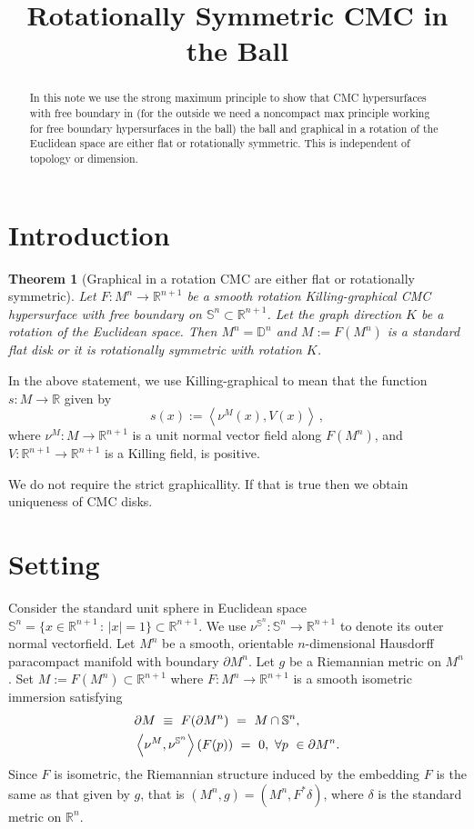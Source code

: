\documentclass[10pt]{amsart}
\title{Rotationally Symmetric CMC in the Ball}
\author{}
\newcommand{\IP}[2]{\left< #1 , #2 \right>}
\newcommand{\R}{\ensuremath{\mathbb{R}}}
\newcommand{\D}{\ensuremath{\mathbb{D}}}
\renewcommand{\S}{\ensuremath{\mathbb{S}}}
\newtheorem{thm}{Theorem}[section]
\theoremstyle{remark}
\begin{document}
\begin{abstract}
In this note we use the strong maximum principle to show that CMC hypersurfaces with free boundary in (for the outside we need a noncompact max principle working for free boundary hypersurfaces in the ball) the ball and graphical in a rotation of the Euclidean space are either flat or rotationally symmetric. This is independent of topology or dimension.
\end{abstract}

\maketitle

\section{Introduction}


\begin{thm}[Graphical in a rotation CMC are either flat or rotationally symmetric]
Let $F:M^n\rightarrow\R^{n+1}$ be a smooth rotation Killing-graphical CMC
hypersurface with free boundary on $\S^n\subset\R^{n+1}$. Let the graph direction $K$ be a rotation of the Euclidean space. Then $M^n = \D^n$
and $M := F(M^n)$ is a standard flat disk or it is rotationally symmetric with rotation $K$.
\label{thmuniqueness}
\end{thm}

In the above statement, we use Killing-graphical to mean that the function
$s:M\rightarrow\R$ given by
\begin{equation}
\label{EQsV}
s(x) := \IP{\nu^M(x)}{V(x)}\,,
\end{equation}
where $\nu^M:M\rightarrow\R^{n+1}$ is a unit normal vector field along $F(M^n)$,
and $V:\R^{n+1}\rightarrow\R^{n+1}$ is a Killing field,
is positive.

 We do not require the strict graphicallity. If that is true then we obtain uniqueness of CMC disks.
\section{Setting}%

Consider the standard unit sphere in Euclidean space $\S^n = \{x\in\R^{n+1}\,:\,|x|=1\}\subset
\R^{n+1}$.
We use $\nu^{\S^n}:\S^{n}\rightarrow\R^{n+1}$ to denote its outer
normal vectorfield.
Let $M^n$ be a smooth, orientable $n$-dimensional Hausdorff paracompact manifold with boundary $\partial M^n$.
Let $g$ be a Riemannian metric on $M^n$.
Set $M:=F(M^n)\subset{\R}^{n+1}$ where $F:M^n\rightarrow {\R}^{n+1}$ is a
smooth isometric immersion satisfying
\begin{align}
&{\partial} M \ \equiv \ F({\partial} M^n)\ =\ M \cap \S^n,\notag\\
&\IP{{\nu}^M}{{\nu}^{\S^n}}(F(p))\ =\ 0, \text{ }\forall
p~\in{\partial} M^n.
\label{initial}
\end{align}
Since $F$ is isometric, the Riemannian structure induced by the embedding $F$
is the same as that given by $g$, that is $(M^n, g) = (M^n, F^*\delta)$, where
$\delta$ is the standard metric on $\R^n$.
\end{document}
